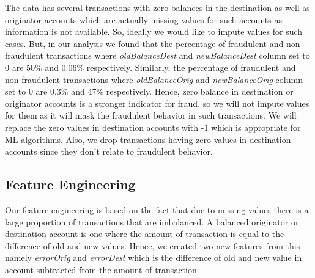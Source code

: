 \documentclass[letterpaper, 12 pt, conference]{ieeeconf}  %
\begin{document}
The data has several transactions with zero balances in the destination as well as originator accounts which are actually missing values for such accounts as information is not available.
So, ideally we would like to impute values for such cases. But, in our analysis we found that the percentage of fraudulent and non-fraudulent transactions where \textit{oldBalanceDest} and \textit{newBalanceDest} column set to 0 are 50\% and 0.06\% respectively. Similarly, the percentage of fraudulent and non-fraudulent transactions where \textit{oldBalanceOrig} and \textit{newBalanceOrig} column set to 0 are 0.3\% and 47\% respectively.
Hence, zero balance in destination or originator accounts is a stronger indicator for fraud, so we will not impute values for them as it will mask the fraudulent behavior in such transactions. We will replace the zero values in destination accounts with -1 which is appropriate for ML-algorithms. Also, we drop transactions having zero values in destination accounts since they don't relate to fraudulent behavior.

\subsection{Feature Engineering}
Our feature engineering is based on the fact that due to missing values there is a large proportion of transactions that are imbalanced. A balanced originator or destination account is one where the amount of transaction is equal to the difference of old and new values. Hence, we created two new features from this namely \textit{errorOrig} and \textit{errorDest} which is the difference of old and new value in account subtracted from the amount of transaction.
\end{document}
